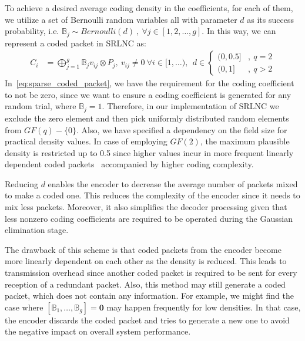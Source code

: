 
To achieve a desired average coding density in the coefficients, for each
of them, we utilize a set of Bernoulli random variables all with parameter
$d$ as its success probability, i.e. $\mathbb{B}_j \sim Bernoulli(d)\ ,\ \forall
j \in [1,2,\ldots,g]$. In this way, we can represent a coded packet in \ac{SRLNC} as:
%
\begin{align} \label{eq:sparse_coded_packet}
    C_i  &= \bigoplus_{j=1}^{g} \mathbb{B}_j v_{ij} \otimes P_j ,\ v_{ij}
    \neq 0\
    \forall i \in [1,\ldots) ,\ \
    d \in
    \begin{cases}
        {(0,0.5]} & ,\ q = 2 \\
        {(0,1]}   & ,\ q > 2
    \end{cases}
\end{align}
%
In~\eqref{eq:sparse_coded_packet}, we have the requirement for the
coding coefficient to not be zero, since we want to ensure a coding
coefficient is generated for any random trial, where
$\mathbb{B}_j = 1$. Therefore, in our implementation of \ac{SRLNC} we
exclude the zero element and then pick uniformly distributed random
elements from $GF(q)-\{ 0 \}$. Also, we have specified a dependency on
the field size for practical density values. In case of employing
$GF(2)$, the maximum plausible density is restricted up to 0.5 since
higher values incur in more frequent linearly dependent coded
packets~\cite{realworld_nc2013} accompanied by higher coding complexity.

Reducing $d$ enables the encoder to decrease the average number of
packets mixed to make a coded one. This reduces the complexity
of the encoder since it needs to mix less packets. Moreover, it also
simplifies the decoder processing given that less nonzero coding
coefficients are required to be operated during the Gaussian
elimination stage.

The drawback of this scheme is that coded packets from the encoder
become more linearly dependent on each other as the density is reduced.  This
leads to transmission overhead since another coded packet is required
to be sent for every reception of a redundant packet.  Also, this
method may still generate a coded packet, which does not contain any
information. For example, we might find the case where
$\left[\mathbb{B}_1, \ldots, \mathbb{B}_g \right] = \mathbf{0}$ may
happen frequently for low densities. In that case, the encoder
discards the coded packet and tries to generate a new one to avoid the
negative impact on overall system performance.

